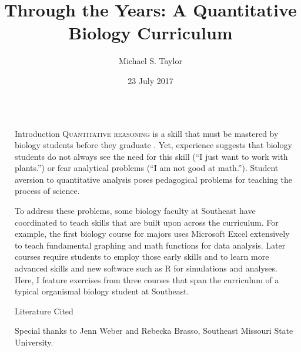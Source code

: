 \documentclass[final,hyperref={pdfpagelabels=false}]{beamer}
\title[A Quantitative Biology Curriculum]{Through the Years: A Quantitative Biology Curriculum}
\author[Taylor]{Michael S. Taylor}
\institute[SEMO]{Department of Biology}
\date{23 July 2017}
\newcommand{\whitespace}{\vspace{0.5\baselineskip}}
\newlength{\sepwid}
\newlength{\onecolwid}
\begin{document}

\begin{frame}[t]
\begin{columns}[t]
	\begin{column}{\sepwid} %
	\end{column}

	\begin{column}{\onecolwid}
    	\begin{block}{Introduction}
    		\textsc{Quantitative reasoning} is a skill that must be mastered by biology students before they graduate \citetext{; ; \citealp{hurney2011closing}}. Yet, experience suggests that biology students do not always see the need for this skill (“I just want to work with plants.”) or fear analytical problems (“I am not good at math.”). Student aversion to quantitative analysis poses pedagogical problems for teaching the process of science.
    		
    		\whitespace

			To address these problems, some biology faculty at Southeast have coordinated to teach skills that are built upon across the curriculum. For example, the first  biology course for majors uses Microsoft Excel extensively to teach fundamental graphing and math functions for data analysis. Later courses require students to employ those early skills and to learn more advanced skills and new software such as R for simulations and analyses.  \textcolor{cardiac}{Here, I feature exercises from three courses that span the curriculum of a typical organismal biology student at Southeast.}  
    	\end{block}

		\vspace*{\sepwid}

		\begin{block}{Literature Cited}
			\setlength{\bibhang}{0.5em}
			
			\raggedright
			{\small }
		\end{block}

		\vspace*{0.35\sepwid}

		Special thanks to Jenn Weber and Rebecka Brasso, Southeast Missouri State University.		


\end{column}
\end{columns}
\end{frame}
\end{document}

